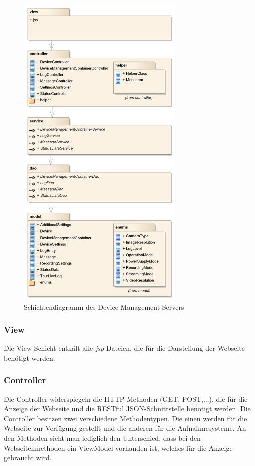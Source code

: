 \begin{figure}[H]
	\centering
	\includegraphics[width=80mm]{images/devmgmtsrv/schichten.jpg}
	\caption{Schichtendiagramm des Device Management Servers}
	\label{fig:devmgmtsrvschichten}
\end{figure}

\subsubsection{View}
Die View Schicht enthält alle \textit{\gls{jsp}} Dateien, die für die Darstellung der Webseite benötigt werden. 

\subsubsection{Controller}
Die Controller widerspiegeln die HTTP-Methoden (GET, POST,...), die für die Anzeige der Webseite und die RESTful JSON-Schnittstelle benötigt werden. Die Controller besitzen zwei verschiedene Methodentypen. Die einen werden für die Webseite zur Verfügung gestellt und die anderen für die Aufnahmesysteme. An den Methoden sieht man lediglich den Unterschied, dass bei den Webseitenmethoden ein ViewModel vorhanden ist, welches für die Anzeige gebraucht wird.


